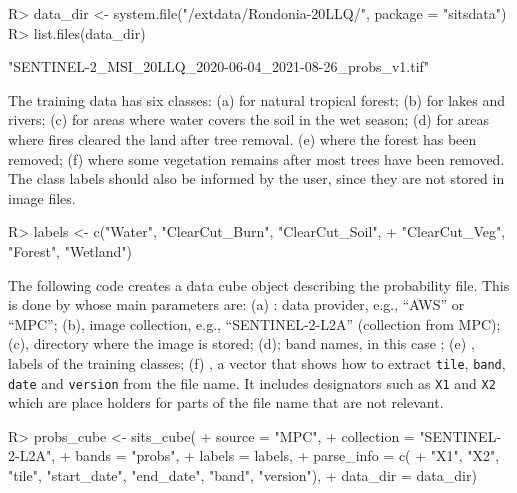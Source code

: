 \documentclass[
  shortnames]{jss}
\begin{document}
\begin{CodeChunk}
\begin{CodeInput}
R> data_dir <- system.file("/extdata/Rondonia-20LLQ/", package = "sitsdata")
R> list.files(data_dir)
\end{CodeInput}
\begin{CodeOutput}
[1] "SENTINEL-2_MSI_20LLQ_2020-06-04_2021-08-26_probs_v1.tif"
\end{CodeOutput}
\end{CodeChunk}

The training data has six classes: (a)  for natural tropical forest; (b)  for lakes and rivers; (c)  for areas where water covers the soil in the wet season; (d)  for areas where fires cleared the land after tree removal. (e)  where the forest has been removed; (f)  where some vegetation remains after most trees have been removed. The class labels should also be informed by the user, since they are not stored in image files.

\begin{CodeChunk}
\begin{CodeInput}
R> labels <- c("Water", "ClearCut_Burn", "ClearCut_Soil",
+             "ClearCut_Veg", "Forest", "Wetland")
\end{CodeInput}
\end{CodeChunk}

The following code creates a data cube object describing the probability file. This is done by  whose main parameters are: (a) : data provider, e.g., ``AWS'' or ``MPC''; (b), image collection, e.g., ``SENTINEL-2-L2A'' (collection from MPC); (c), directory where the image is stored; (d); band names, in this case ; (e) , labels of the training classes; (f) , a vector that shows how to extract \texttt{tile}, \texttt{band}, \texttt{date} and \texttt{version} from the file name. It includes designators such as \texttt{X1} and \texttt{X2} which are place holders for parts of the file name that are not relevant.

\begin{CodeChunk}
\begin{CodeInput}
R> probs_cube <- sits_cube( 
+   source = "MPC",
+   collection = "SENTINEL-2-L2A",
+   bands = "probs",
+   labels = labels,
+   parse_info = c(
+     "X1", "X2", "tile", "start_date", "end_date", "band", "version"),
+   data_dir = data_dir)
\end{CodeInput}
\end{CodeChunk}
\end{document}
